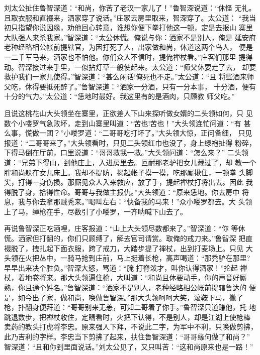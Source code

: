 刘太公扯住鲁智深道：“和尚，你苦了老汉一家儿了！”鲁智深说道：“休怪
无礼。且取衣服和直裰来，洒家穿了说话。”庄家去房里取来，智深穿了。太公道：
“我当初只指望你说因缘，劝他回心转意，谁想你便下拳打他这一顿，定是去报山
寨里大队强人来杀我家。”智深道：“太公休慌。俺说与你：洒家不是别人，俺是
延安府老种经略相公帐前提辖官，为因打死了人，出家做和尚，休道这两个鸟人，
便是一二千军马来，洒家也不怕他。你们众人不信时，提俺禅杖看。”庄客们那里
提得动。智深接过来手里，一似拈灯草一般使起来。太公道：“师父休要走了去，
却要救护我们一家儿使得。”智深道：“甚么闲话!俺死也不走。”太公道：“且
将些酒来师父吃，休得要抵死醉了。”鲁智深道：“洒家一分酒，只有一分本事，
十分酒，便有十分的气力。”太公道：“恁地时最好。我这里有的是酒肉，只顾教
师父吃。”

且说这桃花山大头领坐在寨里，正欲差人下山来探听做女婿的二头领如何，只
见数个小喽罗气急败坏，走到山寨里叫道：“苦也!苦也！”大头领连忙问道：“有
甚么事，慌做一团？”小喽罗道：“二哥哥吃打坏了。”大头领大惊，正问备细，
只见报道：“二哥哥来了。”大头领看时，只见二头领红巾也没了，身上绿袍扯得
粉碎，下得马倒在厅前，口里说道：“哥哥救我一救。”大头领问道：“怎么来？”
二头领道：“兄弟下得山，到他庄上，入进房里去。叵耐那老驴把女儿藏过了，却
教一个胖和尚躲在女儿床上。我却不提防，揭起帐子摸一摸，吃那厮揪住，一顿拳
头脚尖，打得一身伤损。那厮见众人入来救应，放了手，提起禅杖打将出去。因此
我得脱了身，拾得性命。哥哥与我做主报仇。”大头领道：“原来恁地。你去房中
将息，我与你去拿那贼秃来。”喝叫左右：“快备我的马来！”众小喽罗都去。大
头领上了马，绰枪在手，尽数引了小喽罗，一齐呐喊下山去了。

再说鲁智深正吃酒哩，庄客报道：“山上大头领尽数都来了。”智深道：“你
等休慌。洒家但打翻的，你们只顾缚了，解去官司请赏。取俺的戒刀来。”鲁智深
把直裰脱了，拽扎起下面衣服，跨了戒刀，大踏步提了禅杖，出到打麦场上。只见
大头领在火把丛中，一骑马抢到庄前，马上挺着长枪，高声喝道：“那秃驴在那里?
早早出来决个胜负。”智深大怒，骂道：“腌打脊泼才，叫你认得洒家！”抡起
禅杖，着地卷将来。那大头领逼住枪，大叫道：“和尚且休要动手，你的声音好厮
熟，你且通个姓名。”鲁智深道：“洒家不是别人，老种经略相公帐前提辖鲁达的
便是，如今出了家，做和尚，唤做鲁智深。”那大头领呵呵大笑，滚鞍下马，撇了
枪，扑翻身便拜道：“哥哥别来无恙，可知二哥着了你手。”鲁智深只道赚他，托
地跳退数步，把禅杖收住，定睛看时，火把下认得，不是别人，却是江湖上使枪棒
卖药的教头打虎将李忠。原来强人下拜，不说此二字，为军中不利，只唤做剪拂，
此乃吉利的字样。李忠当下剪拂了起来，扶住鲁智深道：“哥哥缘何做了和尚？”
智深道：“且和你到里面说话。”刘太公见了，又只叫苦：“这和尚原来也是一路！”

